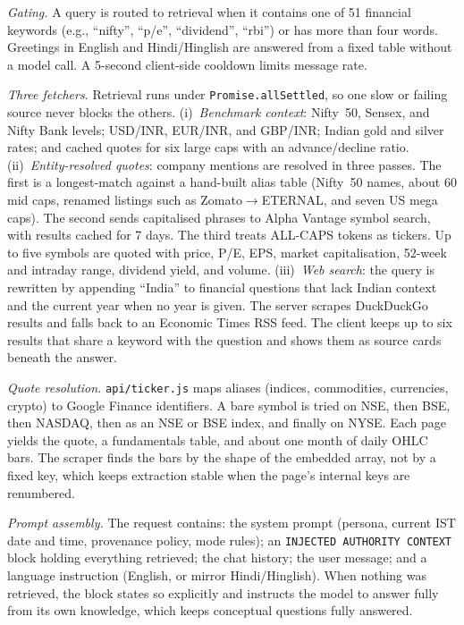 \documentclass[conference]{IEEEtran}
\newcommand{\code}[1]{\texttt{\small #1}}
\begin{document}
\emph{Gating.} A query is routed to retrieval when it contains one of 51 financial keywords (e.g., ``nifty'', ``p/e'', ``dividend'', ``rbi'') or has more than four words. Greetings in English and Hindi/Hinglish are answered from a fixed table without a model call. A 5-second client-side cooldown limits message rate.

\emph{Three fetchers.} Retrieval runs under \code{Promise.allSettled}, so one slow or failing source never blocks the others. (i)~\emph{Benchmark context}: Nifty~50, Sensex, and Nifty Bank levels; USD/INR, EUR/INR, and GBP/INR; Indian gold and silver rates; and cached quotes for six large caps with an advance/decline ratio. (ii)~\emph{Entity-resolved quotes}: company mentions are resolved in three passes. The first is a longest-match against a hand-built alias table (Nifty~50 names, about 60 mid caps, renamed listings such as Zomato$\rightarrow$ETERNAL, and seven US mega caps). The second sends capitalised phrases to Alpha Vantage symbol search, with results cached for 7 days. The third treats ALL-CAPS tokens as tickers. Up to five symbols are quoted with price, P/E, EPS, market capitalisation, 52-week and intraday range, dividend yield, and volume. (iii)~\emph{Web search}: the query is rewritten by appending ``India'' to financial questions that lack Indian context and the current year when no year is given. The server scrapes DuckDuckGo results and falls back to an Economic Times RSS feed. The client keeps up to six results that share a keyword with the question and shows them as source cards beneath the answer.

\emph{Quote resolution.} \code{api/ticker.js} maps aliases (indices, commodities, currencies, crypto) to Google Finance identifiers. A bare symbol is tried on NSE, then BSE, then NASDAQ, then as an NSE or BSE index, and finally on NYSE. Each page yields the quote, a fundamentals table, and about one month of daily OHLC bars. The scraper finds the bars by the shape of the embedded array, not by a fixed key, which keeps extraction stable when the page's internal keys are renumbered.

\emph{Prompt assembly.} The request contains: the system prompt (persona, current IST date and time, provenance policy, mode rules); an \code{INJECTED AUTHORITY CONTEXT} block holding everything retrieved; the chat history; the user message; and a language instruction (English, or mirror Hindi/Hinglish). When nothing was retrieved, the block states so explicitly and instructs the model to answer fully from its own knowledge, which keeps conceptual questions fully answered.
\end{document}
